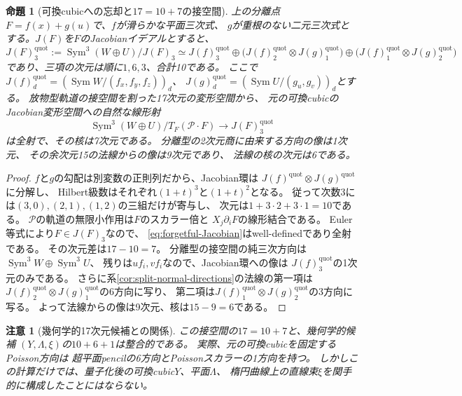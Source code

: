 \documentclass[11pt,a4paper]{ltjsarticle}
\numberwithin{equation}{section}
\newtheorem{proposition}[theorem]{命題}
\newtheorem{remark}[theorem]{注意}
\newcommand{\Sym}{\operatorname{Sym}}
\begin{document}
\begin{proposition}[可換cubicへの忘却と$17=10+7$の接空間]
\label{prop:jacobian-forgetful-tangent}
上の分離点$F=f(x)+g(u)$で、$f$が滑らかな平面三次式、
$g$が重根のない二元三次式とする。$J(F)$を$F$のJacobianイデアルとすると、
\[
  J(F)_3^{\mathrm{quot}}:=\Sym^3(W\oplus U)/J(F)_3
   \simeq J(f)_3^{\mathrm{quot}}
     \oplus\bigl(J(f)_2^{\mathrm{quot}}\otimes J(g)_1^{\mathrm{quot}}\bigr)
     \oplus\bigl(J(f)_1^{\mathrm{quot}}\otimes J(g)_2^{\mathrm{quot}}\bigr)
\]
であり、三項の次元は順に$1,6,3$、合計10である。
ここで$J(f)_d^{\mathrm{quot}}=(\Sym W/(f_x,f_y,f_z))_d$、
$J(g)_d^{\mathrm{quot}}=(\Sym U/(g_u,g_v))_d$とする。
放物型軌道の接空間を割った17次元の変形空間から、
元の可換cubicのJacobian変形空間への自然な線形射
\[
 \Sym^3(W\oplus U)/T_F(\mathcal P\cdot F)
 \longrightarrow J(F)_3^{\mathrm{quot}}
 \tag{J}\label{eq:forgetful-Jacobian}
\]
は全射で、その核は7次元である。
分離型の2次元商に由来する方向の像は1次元、
その余次元15の法線からの像は9次元であり、
法線の核の次元は6である。
\end{proposition}
\begin{proof}
$f$と$g$の勾配は別変数の正則列だから、Jacobian環は
$J(f)^{\mathrm{quot}}\otimes J(g)^{\mathrm{quot}}$に分解し、
Hilbert級数はそれぞれ$(1+t)^3$と$(1+t)^2$となる。
従って次数3には$(3,0),(2,1),(1,2)$の三組だけが寄与し、
次元は$1+3\cdot2+3\cdot1=10$である。
$\mathcal P$の軌道の無限小作用は$F$のスカラー倍と
$X_j\partial_i F$の線形結合である。
Euler等式により$F\in J(F)_3$なので、
\eqref{eq:forgetful-Jacobian}はwell-definedであり全射である。
その次元差は$17-10=7$。
分離型の接空間の純三次方向は$\Sym^3W\oplus\Sym^3U$、
残りは$u f_i,v f_i$なので、Jacobian環への像は
$J(f)_3^{\mathrm{quot}}$の1次元のみである。
さらに系\ref{cor:split-normal-directions}の法線の第一項は
$J(f)_2^{\mathrm{quot}}\otimes J(g)_1^{\mathrm{quot}}$の6方向に写り、
第二項は$J(f)_1^{\mathrm{quot}}\otimes J(g)_2^{\mathrm{quot}}$の3方向に写る。
よって法線からの像は9次元、核は$15-9=6$である。
\end{proof}
\begin{remark}[幾何学的17次元候補との関係]
\label{rem:forgetful-geometry-not-model}
この接空間の$17=10+7$と、幾何学的候補
$(Y,\Lambda,\xi)$の$10+6+1$は整合的である。
実際、元の可換cubicを固定するPoisson方向は
超平面pencilの6方向とPoissonスカラーの1方向を持つ。
しかしこの計算だけでは、量子化後の可換cubic$Y$、平面$\Lambda$、
楕円曲線上の直線束$\xi$を関手的に構成したことにはならない。
\end{remark}
\end{document}
